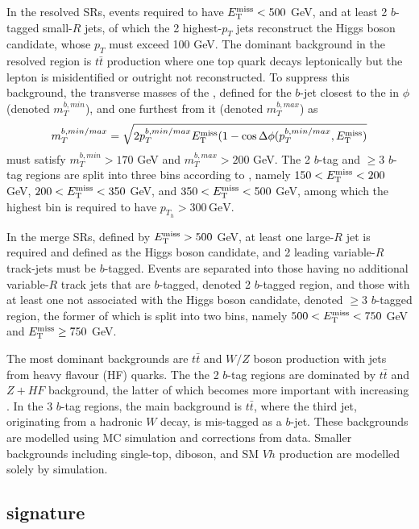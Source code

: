 In the resolved SRs, events required to have $E_{\mathrm{T}}^{\mathrm{miss}}<500 $ GeV, and at least 2 $b$-tagged small-$R$ jets, of which the 2 highest-$p_T$ jets reconstruct the Higgs boson candidate, whose $p_T$ must exceed 100 GeV. The dominant background in the resolved region is $t\bar{t}$ production where one top quark decays leptonically but the lepton is misidentified or outright not reconstructed. To suppress this background, the transverse masses of the \met, defined for the $b$-jet closest to the \met in $\phi$ (denoted $m_T^{b,min}$), and one furthest from it (denoted $m_T^{b,max}$) as
\begin{equation}
    \label{4.10}
    m_T^{b,min/max} = \sqrt{2p_T^{b,min/max}E_{\mathrm{T}}^{\mathrm{miss}}(1-\cos\Delta\phi(p_T^{b,min/max}, E_{\mathrm{T}}^{\mathrm{miss}})}
\end{equation}
must satisfy $m_T^{b,min} > 170 $ GeV and $m_T^{b,max}>200$ GeV. The 2 $b$-tag and $\ge 3$ $b$-tag regions are split into three bins according to \met, namely $150<E_{\mathrm{T}}^{\mathrm{miss}}<200 $ GeV, $200<E_{\mathrm{T}}^{\mathrm{miss}}<350 $ GeV, and $350<E_{\mathrm{T}}^{\mathrm{miss}}<500 $ GeV, among which the highest \met bin is required to have  $p_{T_h} > 300\,\mathrm{GeV}$. 

In the merge SRs, defined by $E_{\mathrm{T}}^{\mathrm{miss}}>500$ GeV, at least one large-$R$ jet is required and defined as the Higgs boson candidate, and 2 leading variable-$R$ track-jets must be $b$-tagged. Events are separated into those having no additional variable-$R$ track jets that are $b$-tagged, denoted 2 $b$-tagged region, and those with at least one not associated with the Higgs boson candidate, denoted $\ge3$ $b$-tagged region, the former of which is split into two \met bins, namely $500<E_{\mathrm{T}}^{\mathrm{miss}}<750 $ GeV and $E_{\mathrm{T}}^{\mathrm{miss}}\ge750$ GeV.

The most dominant backgrounds are $t\bar{t}$ and $W/Z$ boson production with jets from heavy flavour (HF) quarks. The the 2 $b$-tag regions are dominated by $t\bar{t}$ and $Z+HF$ background, the latter of which becomes more important with increasing \met. In the 3 $b$-tag regions, the main background is $t\bar{t}$, where the third jet, originating from a hadronic $W$ decay, is mis-tagged as a $b$-jet. These backgrounds are modelled using MC simulation and corrections from data. Smaller backgrounds including single-top, diboson, and SM $Vh$ production are modelled solely by simulation. 

\subsection{\texorpdfstring{\monohgamgam}{TEXT} signature}

